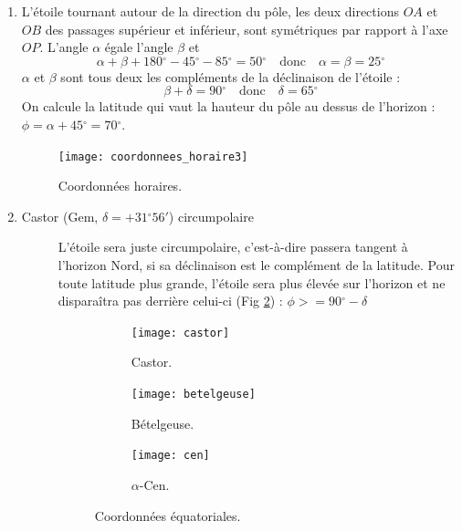 \documentclass[a4paper,10pt]{report}
\renewcommand{\deg}{\ensuremath{^{\circ}}}
\begin{document}
\begin{Answer}
  \begin{enumerate}
  \item L'étoile tournant autour de la direction du pôle, les deux
    directions $OA$ et $OB$ des passages supérieur et inférieur, sont
    symétriques par rapport à l'axe $OP$. L'angle $\alpha$ égale
    l'angle $\beta$ et
    $$
    \alpha + \beta+180\deg - 45\deg -85\deg = 50\deg
    \quad\text{donc}\quad
    \alpha=\beta=25\deg
    $$
    $\alpha$ et $\beta$ sont tous deux les compléments de la
    déclinaison de l'étoile :
    $$
    \beta+\delta = 90\deg
    \quad\text{donc}\quad
    \delta=65\deg
    $$
    On calcule la latitude qui vaut la hauteur du pôle au dessus de
    l'horizon : $\phi=\alpha+45\deg=70\deg$.

    \begin{figure}%
      \centering
      \texttt{[image: coordonnees\_horaire3]}
      \caption{Coordonnées horaires.}
      \label{coordonneeshoraire3}
    \end{figure}

  \item
    \begin{description}
    \item[Castor (Gem, $\delta = +31\deg56'$) circumpolaire]
      L'étoile sera juste circumpolaire, c'est-à-dire passera tangent
      à l'horizon Nord, si sa déclinaison est le complément de la
      latitude.  Pour toute latitude plus grande, l'étoile sera plus
      élevée sur l'horizon et ne disparaîtra pas derrière celui-ci
      (Fig \ref{castor}) : $\phi>=90\deg-\delta$
      \begin{figure}[htp]
        \centering
        \begin{subfigure}[b]{0.3\textwidth}
          \centering
          \texttt{[image: castor]}
          \caption{Castor.}
        \label{castor}
        \end{subfigure}
        \begin{subfigure}[b]{0.3\textwidth}
          \centering
          \texttt{[image: betelgeuse]}
          \caption{Bételgeuse.}
          \label{betelgeuse}
        \end{subfigure}
        \begin{subfigure}[b]{0.3\textwidth}
          \centering
          \texttt{[image: cen]}
          \caption{$\alpha$-Cen.}
          \label{cen}
        \end{subfigure}
        \caption{Coordonnées équatoriales.}
      \end{figure}


\end{description}
\end{enumerate}
\end{Answer}
\end{document}
